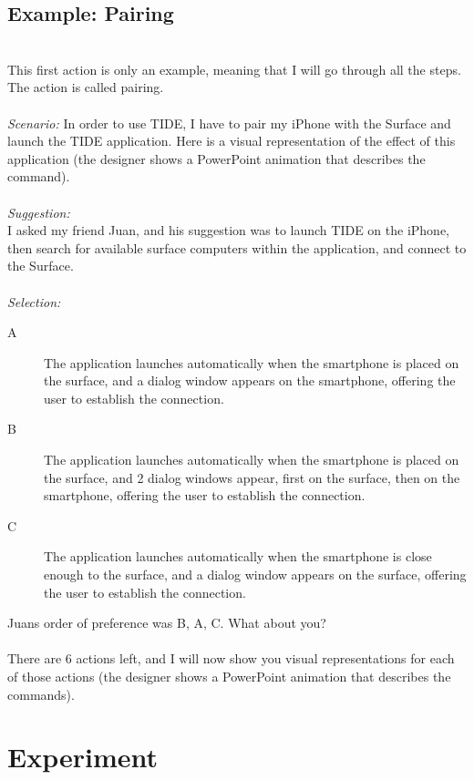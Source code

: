\subsection{Example: Pairing}
\hfill\\
This first action is only an example, meaning that I will go through all the steps.
The action is called pairing.
\hfill\\
\hfill\\
\emph{Scenario:}
In order to use TIDE, I have to pair my iPhone with the Surface and launch the TIDE application.
Here is a visual representation of the effect of this application (the designer shows a PowerPoint animation that describes the command).
\hfill\\
\hfill\\
\emph{Suggestion:}\\
I asked my friend Juan, and his suggestion was to launch TIDE on the iPhone, then search for available surface computers within the application,  and connect to the Surface.
\hfill\\
\hfill\\
\emph{Selection:}
\begin{description}
\item[A]{The application launches automatically when the smartphone is placed on the surface, and a dialog window appears on the smartphone, offering the user to establish the connection.}
\item[B]{The application launches automatically when the smartphone is placed on the surface, and 2 dialog windows appear, first on the surface, then on the smartphone, offering the user to establish the connection.}
\item[C]{The application launches automatically when the smartphone is close enough to the surface, and a dialog window appears on the surface, offering the user to establish the connection.}
\end{description}

Juans order of preference was B, A, C.
What about you?
\hfill\\
\hfill\\
There are 6 actions left, and I will now show you visual representations for each of those actions (the designer shows a PowerPoint animation that describes the commands).

\section{Experiment}

